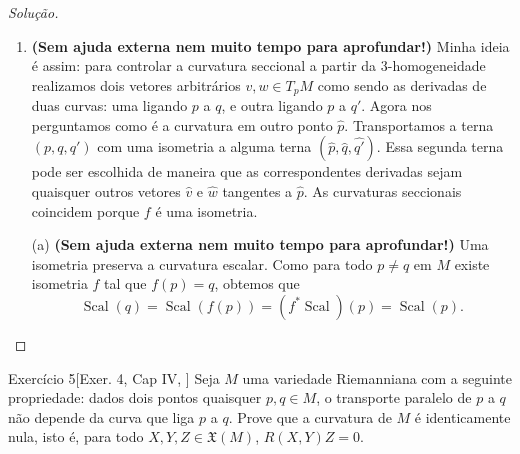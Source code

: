 \begin{proof}[Solução]
\begin{enumerate}[label=(\alph*)]
\item \textbf{(Sem ajuda externa nem muito tempo para aprofundar!)} Minha ideia é assim: para controlar a curvatura seccional a partir da 3-homogeneidade realizamos dois vetores arbitrários \(v,w \in T_pM\) como sendo as derivadas de duas curvas: uma ligando \(p\) a \(q\), e outra ligando \(p\) a \(q'\). Agora nos perguntamos como é a curvatura em outro ponto  \(\hat{p}\). Transportamos a terna \((p,q,q')\) com uma isometria a alguma terna \((\hat{p},\hat{q},\hat{q'})\). Essa segunda terna pode ser escolhida de maneira que as correspondentes derivadas sejam quaisquer outros vetores \(\hat{v}\) e \(\hat{w}\) tangentes a \(\hat{p}\). As curvaturas seccionais coincidem porque \(f\) é uma isometria.
\item[(a)] \textbf{(Sem ajuda externa nem muito tempo para aprofundar!)} Uma isometria preserva a curvatura escalar. Como para todo \(p \neq q\) em \(M\) existe isometria \(f\) tal que \(f(p)=q\), obtemos que
	\[\operatorname{Scal}(q)=\operatorname{Scal}(f(p))=(f^*\operatorname{Scal})(p)=\operatorname{Scal}(p).\]
\end{enumerate}
\end{proof}

\begin{thing4}{Exercício 5}[Exer. 4, Cap IV, \cite{doc}]\label{exer:5}\leavevmode
Seja \(M\) uma variedade Riemanniana com a seguinte propriedade: dados dois pontos quaisquer \(p,q \in M\), o transporte paralelo de \(p\) a \(q\) não depende da curva que liga \(p\) a \(q\). Prove que a curvatura de \(M\) é identicamente nula, isto é, para todo \(X,Y,Z \in \mathfrak{X}(M)\), \(R(X,Y)Z=0\).
\end{thing4}

